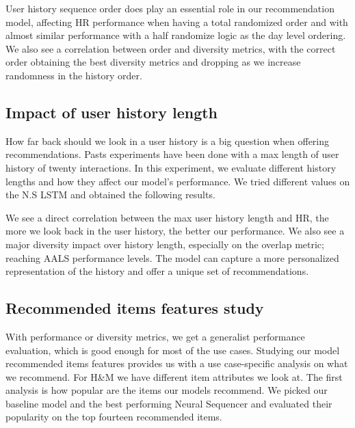 \documentclass{tex_files/kththesis}
\begin{document}
\begin{center}

\end{center}

User history sequence order does play an essential role in our recommendation model, affecting HR performance when having a total randomized order and with almost similar performance with a half randomize logic as the day level ordering. We also see a correlation between order and diversity metrics, with the correct order obtaining the best diversity metrics and dropping as we increase randomness in the history order.


\subsection{Impact of user history length}
How far back should we look in a user history is a big question when offering recommendations. Pasts experiments have been done with a max length of user history of twenty interactions. In this experiment, we evaluate different history lengths and how they affect our model's performance. We tried different values on the N.S LSTM and obtained the following results.

\begin{center}

\end{center}


We see a direct correlation between the max user history length and HR, the more we look back in the user history, the better our performance. We also see a major diversity impact over history length, especially on the overlap metric; reaching AALS performance levels. The model can capture a more personalized representation of the history and offer a unique set of recommendations.

\subsection{Recommended items features study}
With performance or diversity metrics, we get a generalist performance evaluation, which is good enough for most of the use cases. Studying our model recommended items features provides us with a use case-specific analysis on what we recommend. For H\&M we have different item attributes we look at. The first analysis is how popular are the items our models recommend. We picked our baseline model and the best performing Neural Sequencer and evaluated their popularity on the top fourteen recommended items.
\end{document}
